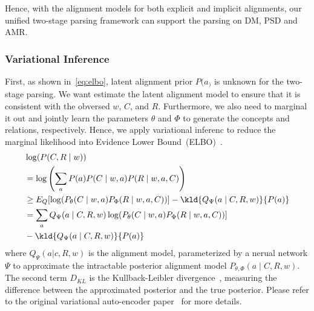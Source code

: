 Hence, with the alignment models for both explicit and implicit
alignments, our unified two-stage parsing framework can support the
parsing on DM, PSD and AMR.

\subsubsection{Variational Inference}
\label{sssec:lex-phr:vae}
First, as shown in~\autoref{eq:elbo}, latent alignment prior $P(a_)$
is unknown for the two-stage parsing. We want estimate the latent
alignment model to ensure that it is consistent with the obversed $w$,
$C$, and $R$. Furthermore, we also need to marginal it out and jointly
learn the parameters $\theta$ and $\Phi$ to generate the concepts and
relations, respectively. Hence, we apply variational inferenc to reduce
the marginal likelihood into Evidence Lower
Bound~(ELBO)~\citep{kingma2013auto}.
\begin{equation}
 \label{eq:elbo}
\begin{aligned}
  & \log(P(C,R \mid w)) \\
  & = \log\left(\sum_{a}P(a) P(C\mid w, a) P(R\mid w,a,C)\right) \\
  & \ge E_{Q}[\log(P_{\theta}(C\mid w,a) P_{\Phi}(R\mid w,a,C))] - \kld{Q_{\Psi}(a\mid C, R,w)}{P(a)} \\
  & = \sum_{a}Q_{\Psi}(a\mid C, R,w)\log(P_{\theta}(C\mid w,a) P_{\Phi}(R\mid w,a,C))] \\
  & - \kld{Q_{\Psi}(a\mid C, R,w)}{P(a)}
\end{aligned}
\end{equation}
where $Q_{\Psi}(a|c,R,w)$ is the alignment model, parameterized by a
nerual network $\Psi$ to approximate the intractable posterior alignment
model $P_{\theta,\Phi}(a\mid C, R, w)$. The second term $D_{{KL}}$ is the
Kullback-Leibler divergence~\citep{kl-ims}, measuring the difference
between the approximated posterior and the true posterior. Please
refer to the original variational auto-encoder
paper~\citep{kingma2013auto} for more details.

